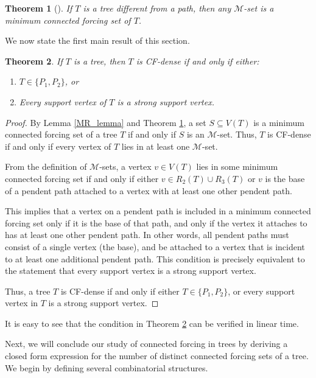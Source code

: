 \documentclass[11pt]{article}
\newtheorem{thm}{Theorem}
\theoremstyle{definition}
\newcommand{\1}{\vspace{0.1cm}}
\newcommand{\2}{\vspace{0.2cm}}
\newcommand{\3}{\vspace{0.3cm}}
\begin{document}
\begin{thm}[\cite{cf-complexity}]
\label{tree_thm}
If $T$ is a tree different from a path, then any $\mathcal{M}$-set is a minimum connected forcing set of $T$.
\end{thm}

We now state the first main result of this section.

\begin{thm}\label{thm:tree-characterization}
If $T$ is a tree, then $T$ is CF-dense if and only if either:
\begin{enumerate}
    \item $ T \in \{ P_1, P_2 \} $, or
    \item Every support vertex of $ T $ is a strong support vertex.
\end{enumerate}
\end{thm}

\begin{proof}
By Lemma \ref{MR_lemma} and Theorem \ref{tree_thm}, a set $ S \subseteq V(T) $ is a minimum connected forcing set of a tree $ T $ if and only if $ S $ is an $ \mathcal{M} $-set. Thus, $ T $ is CF-dense if and only if every vertex of $ T $ lies in at least one $ \mathcal{M} $-set.

From the definition of $ \mathcal{M} $-sets, a vertex $ v \in V(T) $ lies in some minimum connected forcing set if and only if either $ v \in R_2(T) \cup R_3(T) $ or $ v $ is the base of a pendent path attached to a vertex with at least one other pendent path.

This implies that a vertex on a pendent path is included in a minimum connected forcing set only if it is the base of that path, and only if the vertex it attaches to has at least one other pendent path. In other words, all pendent paths must consist of a single vertex (the base), and be attached to a vertex that is incident to at least one additional pendent path. This condition is precisely equivalent to the statement that every support vertex is a strong support vertex.

Thus, a tree $ T $ is CF-dense if and only if either $ T \in \{ P_1, P_2 \} $, or every support vertex in $ T $ is a strong support vertex.
\end{proof}

\noindent It is easy to see that the condition in Theorem \ref{thm:tree-characterization} can be verified in linear time.
 
\noindent Next, we will conclude our study of connected forcing in trees by deriving a closed form expression for the number of distinct connected forcing sets of a tree. We begin by defining several combinatorial structures.
\end{document}
